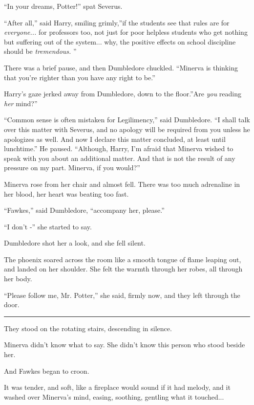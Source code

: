 ``In your dreams, Potter!'' spat Severus.

``After all,'' said Harry, smiling grimly,''if the students see that
rules are for \emph{everyone...} for professors too, not just for
poor helpless students who get nothing but suffering out of the
system... why, the positive effects on school discipline should be
\emph{tremendous.} ''

There was a brief pause, and then Dumbledore chuckled. ``Minerva is
thinking that you're righter than you have any right to be.''

Harry's gaze jerked away from Dumbledore, down to the floor.''Are
\emph{you} reading \emph{her} mind?''

``Common sense is often mistaken for Legilimency,'' said Dumbledore. ``I
shall talk over this matter with Severus, and no apology will be
required from you unless he apologizes as well. And now I declare this
matter concluded, at least until lunchtime.'' He paused. ``Although,
Harry, I'm afraid that Minerva wished to speak with you about an
additional matter. And that is not the result of any pressure on my
part. Minerva, if you would?''

Minerva rose from her chair and almost fell. There was too much
adrenaline in her blood, her heart was beating too fast.

``Fawkes,'' said Dumbledore, ``accompany her, please.''

``I don't -'' she started to say.

Dumbledore shot her a look, and she fell silent.

The phoenix soared across the room like a smooth tongue of flame leaping
out, and landed on her shoulder. She felt the warmth through her robes,
all through her body.

``Please follow me, Mr. Potter,'' she said, firmly now, and they left
through the door.

\begin{center}\rule{3in}{0.4pt}\end{center}

They stood on the rotating stairs, descending in silence.

Minerva didn't know what to say. She didn't know this person who stood
beside her.

And Fawkes began to croon.

It was tender, and soft, like a fireplace would sound if it had melody,
and it washed over Minerva's mind, easing, soothing, gentling what it
touched...

